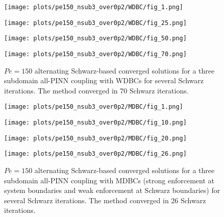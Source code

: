 \documentclass[oneside,final]{csri23}
\begin{document}
\begin{figure}
    \begin{minipage}{0.49\linewidth}
        \texttt{[image: plots/pe150\_nsub3\_over0p2/WDBC/fig\_1.png]}
    \end{minipage}
    \begin{minipage}{0.49\linewidth}
        \texttt{[image: plots/pe150\_nsub3\_over0p2/WDBC/fig\_25.png]}
    \end{minipage}
    
    \begin{minipage}{0.49\linewidth}
        \texttt{[image: plots/pe150\_nsub3\_over0p2/WDBC/fig\_50.png]}
    \end{minipage}
    \begin{minipage}{0.49\linewidth}
        \texttt{[image: plots/pe150\_nsub3\_over0p2/WDBC/fig\_70.png]}
    \end{minipage}
    \caption{$Pe = 150$ alternating Schwarz-based converged solutions for a three subdomain all-PINN coupling with WDBCs for several Schwarz iterations.  The method converged in 70 Schwarz iterations.}
    \label{fig:WDBC_Pe150}
\end{figure}

\begin{figure}
    \begin{minipage}{0.49\linewidth}
        \texttt{[image: plots/pe150\_nsub3\_over0p2/MDBC/fig\_1.png]}
    \end{minipage}
    \begin{minipage}{0.49\linewidth}
        \texttt{[image: plots/pe150\_nsub3\_over0p2/MDBC/fig\_10.png]}
    \end{minipage}
    
    \begin{minipage}{0.49\linewidth}
        \texttt{[image: plots/pe150\_nsub3\_over0p2/MDBC/fig\_20.png]}
    \end{minipage}
    \begin{minipage}{0.49\linewidth}
        \texttt{[image: plots/pe150\_nsub3\_over0p2/MDBC/fig\_26.png]}
    \end{minipage}
    \caption{$Pe = 150$ alternating Schwarz-based converged solutions for a three subdomain all-PINN coupling with MDBCs (strong enforcement at system boundaries and weak enforcement at Schwarz boundaries) for several Schwarz iterations.  The method converged in 26 Schwarz iterations.}
    \label{fig:MDBC_Pe150}
\end{figure}
\end{document}
